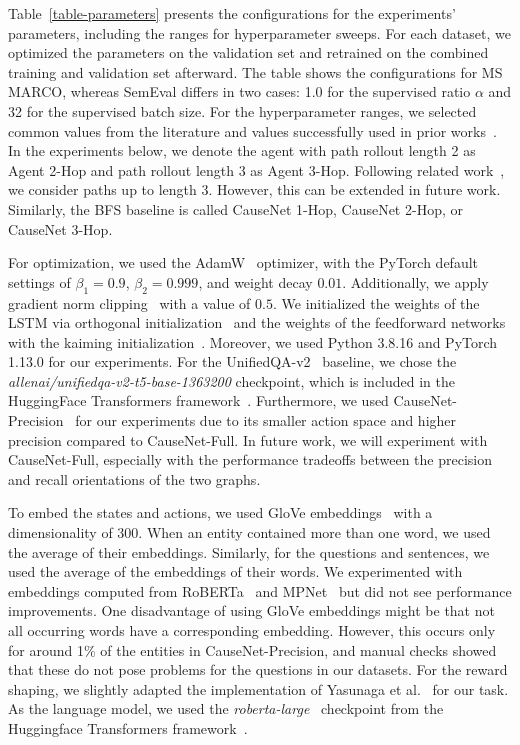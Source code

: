 Table~\ref{table-parameters} presents the configurations for the experiments' parameters, including the ranges for hyperparameter sweeps.
For each dataset, we optimized the 
parameters on the validation set and retrained on the combined training and 
validation set afterward. The table shows the configurations for MS MARCO, whereas SemEval differs 
in two cases: 1.0 for the supervised ratio $\alpha$ and 32 for the supervised batch size.
For the hyperparameter ranges, we selected common values from the literature and values 
 successfully used in prior works~\cite{Das2018Minerva, Lin2020RewardShaping, Peng2018Mimic}.
In the experiments below, we denote the agent with path rollout length 2 as 
Agent 2-Hop and path rollout length 3 as Agent 3-Hop. Following related work~\cite{Das2018Minerva, Qiu2020Stepwise}, we consider paths up to length 3. However, 
this can be extended in future work. Similarly, the BFS 
baseline is called CauseNet 1-Hop, CauseNet 2-Hop, or CauseNet 3-Hop.


For optimization, we used the AdamW~\cite{Loshchilov2019AdamW} optimizer, with the PyTorch default settings of
$\beta_1 = 0.9 $, $\beta_2 = 0.999$, and weight decay $0.01$.
Additionally, we apply gradient norm clipping~\cite{Pascanu2013Clip} with a value of $0.5$.
We initialized the weights of the LSTM via orthogonal initialization~\cite{Saxe2014Orthogonal} and 
the weights of the feedforward networks with the kaiming initialization~\cite{Kaming2015Init}.
Moreover, we used Python 3.8.16 and PyTorch 1.13.0 for our experiments.
For the UnifiedQA-v2~\cite{Khashabi2020UnifiedQA, Khashabi2022UnifiedQA2} baseline, we chose 
the \textit{allenai/unifiedqa-v2-t5-base-1363200} checkpoint, which is included in 
the HuggingFace Transformers framework~\cite{Wolf2020Transformers}.
Furthermore, we used CauseNet-Precision~\cite{Heindorf2020Causenet} for our 
experiments due to its smaller action space and higher precision compared 
to CauseNet-Full. In future work, we will experiment with CauseNet-Full, especially 
with the performance tradeoffs between the precision and recall orientations of the 
two graphs.

To embed the states and actions, we used GloVe embeddings~\cite{Pennington2014Glove} with a dimensionality of 300.
When an entity contained more than one word, we used the average of their embeddings. Similarly, for the 
questions and sentences, we used the average of the embeddings of their words. 
We experimented with embeddings computed from RoBERTa~\cite{Liu2019Roberta} and MPNet~\cite{Song2020MPNet} 
but did not see performance improvements. 
One disadvantage of using GloVe embeddings might be that not all occurring words have a 
corresponding embedding. However, this occurs only for around 1\% of the entities in CauseNet-Precision, and 
manual checks showed that these do not pose problems for the questions in our datasets.
For the reward shaping, we slightly adapted the implementation of Yasunaga et al.~\cite{Yasunaga2021QAGNN} 
for our task. As the language model, we used the \textit{roberta-large}~\cite{Liu2019Roberta} checkpoint
from the Huggingface Transformers framework~\cite{Wolf2020Transformers}.

